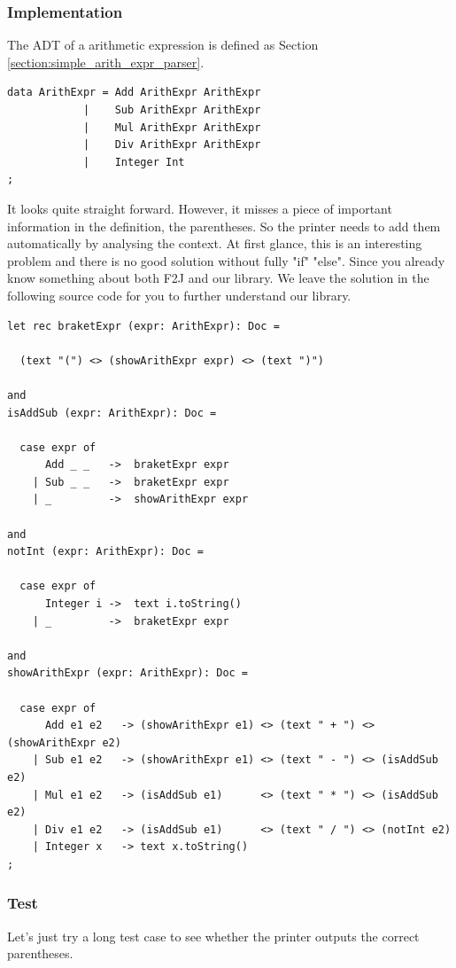 \subsubsection{Implementation}
The ADT of a arithmetic expression is defined as Section \ref{section:simple_arith_expr_parser}.
\begin{lstlisting}
data ArithExpr = Add ArithExpr ArithExpr
            |    Sub ArithExpr ArithExpr
            |    Mul ArithExpr ArithExpr
            |    Div ArithExpr ArithExpr
            |    Integer Int
;
\end{lstlisting}

It looks quite straight forward. However, it misses a piece of important information in the definition, the parentheses. So the printer needs to add them automatically by analysing the context. At first glance, this is an interesting problem and there is no good solution without fully "if" "else". Since you already know something about both F2J and our library. We leave the solution in the following source code for you to further understand our library.

\begin{lstlisting}
let rec braketExpr (expr: ArithExpr): Doc =

  (text "(") <> (showArithExpr expr) <> (text ")")

and
isAddSub (expr: ArithExpr): Doc =

  case expr of
      Add _ _   ->  braketExpr expr
    | Sub _ _   ->  braketExpr expr
    | _         ->  showArithExpr expr

and
notInt (expr: ArithExpr): Doc =

  case expr of
      Integer i ->  text i.toString()
    | _         ->  braketExpr expr

and
showArithExpr (expr: ArithExpr): Doc =

  case expr of
      Add e1 e2   -> (showArithExpr e1) <> (text " + ") <> (showArithExpr e2)
    | Sub e1 e2   -> (showArithExpr e1) <> (text " - ") <> (isAddSub e2)
    | Mul e1 e2   -> (isAddSub e1)      <> (text " * ") <> (isAddSub e2)
    | Div e1 e2   -> (isAddSub e1)      <> (text " / ") <> (notInt e2)
    | Integer x   -> text x.toString()
;
\end{lstlisting}

\subsubsection{Test}
Let's just try a long test case to see whether the printer outputs the correct parentheses.


